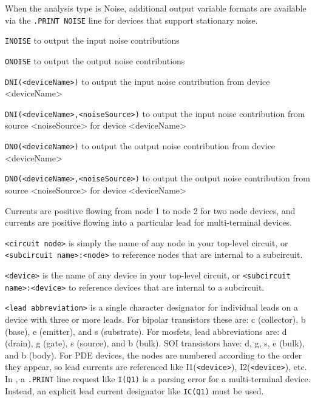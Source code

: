 \begin{Command}
\begin{Arguments}
When the analysis type is Noise, additional output variable formats are available
via the \texttt{.PRINT NOISE} line for devices that support stationary noise.
\begin{XyceItemize}
\item \texttt{INOISE} to output the input noise contributions
\item \texttt{ONOISE} to output the output noise contributions
\item \texttt{DNI(<deviceName>)} to output the input noise contribution from device <deviceName>
\item \texttt{DNI(<deviceName>,<noiseSource>)} to output the input noise contribution from
                source <noiseSource> for device <deviceName>
\item \texttt{DNO(<deviceName>)} to output the output noise contribution from device <deviceName>
\item \texttt{DNO(<deviceName>,<noiseSource>)} to output the output noise contribution from
                source <noiseSource> for device <deviceName>
\end{XyceItemize}

\end{Arguments}

\comments

\begin{XyceItemize}
\item Currents are positive flowing from node 1 to node 2 for two node
  devices, and currents are positive flowing into a particular lead for
  multi-terminal devices.

\item \texttt{<circuit node>} is simply the name of any node in your
  top-level circuit, or \texttt{<subcircuit name>:<node>} to reference
  nodes that are internal to a subcircuit.

\item \texttt{<device>} is the name of any device in your top-level
  circuit, or \texttt{<subcircuit name>:<device>} to reference devices
  that are internal to a subcircuit.

\item \texttt{<lead abbreviation>} is a single character designator for
  individual leads on a device with three or more leads.  For bipolar
  transistors these are: c (collector), b (base), e (emitter), and s
  (substrate).  For mosfets, lead abbreviations are: d (drain), g
  (gate), s (source), and b (bulk).  SOI transistors have: d, g, s, e
  (bulk), and b (body).  For PDE devices, the nodes are numbered
  according to the order they appear, so lead currents are referenced
  like I1(\texttt{<device>}), I2(\texttt{<device>}), etc.  In \Xyce{},
  a \texttt{.PRINT} line request like \texttt{I(Q1)} is a parsing error
  for a multi-terminal  device.  Instead, an explicit lead current
  designator like \texttt{IC(Q1)} must be used.


\end{XyceItemize}
\end{Command}
